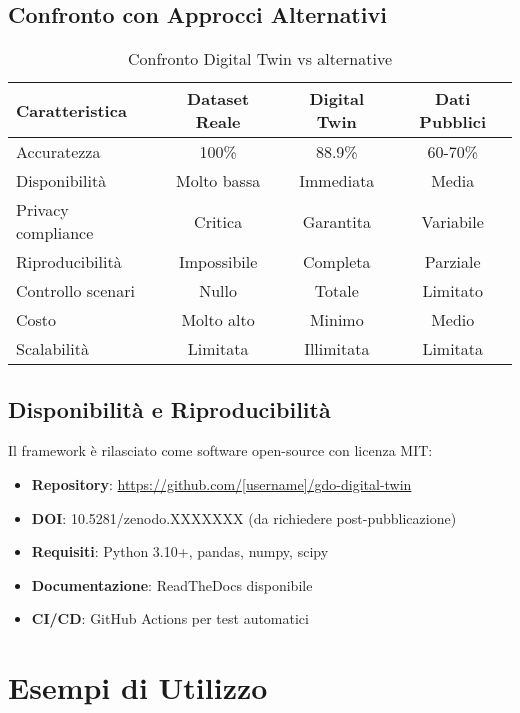 \subsection{\texorpdfstring{Confronto con Approcci Alternativi}{B.1.7 - Confronto con Approcci Alternativi}}

\begin{table}[h]
\centering
\caption{Confronto Digital Twin vs alternative}
\label{tab:comparison}
\begin{tabular}{@{}lccc@{}}
\toprule
\textbf{Caratteristica} & \textbf{Dataset Reale} & \textbf{Digital Twin} & \textbf{Dati Pubblici} \\
\midrule
Accuratezza & 100\% & 88.9\% & 60-70\% \\
Disponibilità & Molto bassa & Immediata & Media \\
Privacy compliance & Critica & Garantita & Variabile \\
Riproducibilità & Impossibile & Completa & Parziale \\
Controllo scenari & Nullo & Totale & Limitato \\
Costo & Molto alto & Minimo & Medio \\
Scalabilità & Limitata & Illimitata & Limitata \\
\bottomrule
\end{tabular}
\end{table}

\subsection{\texorpdfstring{Disponibilità e Riproducibilità}{B.1.8 - Disponibilità e Riproducibilità}}

Il framework è rilasciato come software open-source con licenza MIT:

\begin{itemize}
    \item \textbf{Repository}: \url{https://github.com/[username]/gdo-digital-twin}
    \item \textbf{DOI}: 10.5281/zenodo.XXXXXXX (da richiedere post-pubblicazione)
    \item \textbf{Requisiti}: Python 3.10+, pandas, numpy, scipy
    \item \textbf{Documentazione}: ReadTheDocs disponibile
    \item \textbf{CI/CD}: GitHub Actions per test automatici
\end{itemize}

\section{\texorpdfstring{Esempi di Utilizzo}{B.2 - Esempi di Utilizzo}}

